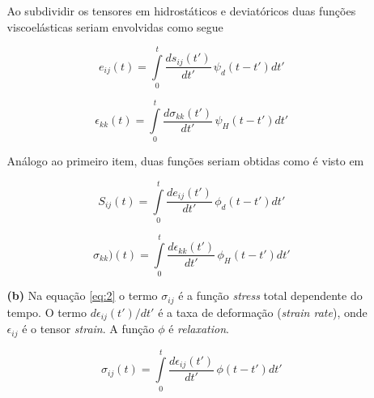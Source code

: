\documentclass[a4paper, 12pt, brazilian]{article}
\begin{document}
\begin{itemize}
\begin{itemize}
			Ao subdividir os tensores em hidrostáticos e deviatóricos duas funções viscoelásticas seriam envolvidas como segue
			
			\begin{equation}
				e_{ij}(t)=\int\limits_{0}^{t}\dfrac{ds_{ij}(t')}{dt'}\,\psi_{d}(t-t')dt'
			\end{equation}
			
			\begin{equation}
				\epsilon_{kk}(t)=\int\limits_{0}^{t}\dfrac{d\sigma_{kk}(t')}{dt'}\,\psi_{H}(t-t')dt'
			\end{equation}
			
			Análogo ao primeiro item, duas funções seriam obtidas como é visto em 
			
			\begin{equation}
				S_{ij}(t)=\int\limits_{0}^{t}\dfrac{de_{ij}(t')}{dt'}\,\phi_{d}(t-t')dt'
			\end{equation}
			
			\begin{equation}
				\sigma_{kk})(t)=\int\limits_{0}^{t}\dfrac{d\epsilon_{kk}(t')}{dt'}\,\phi_{H}(t-t')dt'
			\end{equation}
			
			\item[\textbf{(b)}] Na equação \eqref{eq:2} o termo $\sigma_{ij}$ é a função \textit{stress} total dependente do tempo. O termo $d\epsilon_{ij}(t')/dt'$ é a taxa de deformação (\textit{strain rate}), onde $\epsilon_{ij}$ é o tensor \textit{strain}. A função $\phi$ é \textit{relaxation}.
			
			\begin{equation}
				\label{eq:2}
				\sigma_{ij}(t)=\int\limits_{0}^{t}\dfrac{d\epsilon_{ij}(t')}{dt'}\,\phi(t-t')dt'
			\end{equation}
		\end{itemize}
	
		
	

\end{itemize}
\end{document}
